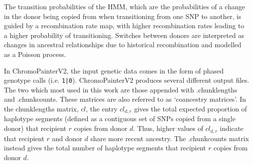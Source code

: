 The transition probabilities of the HMM, which are the probabilities of a change in the donor being copied from when transitioning from one SNP to another, is guided by a recombination rate map, with higher recombination rates leading to a higher probability of transitioning. Switches between donors are interpreted as changes in ancestral relationships due to historical recombination and modelled as a Poisson process. 

In ChromoPainterV2, the input genetic data comes in the form of phased genotype calls (i.e. \texttt{1|0}). ChromoPainterV2 produces several different output files. The two which most used in this work are those appended with .chunklengths and .chunkcounts. These matrices are also referred to as `coancestry matrices'. In the chunklengths matrix, $cl$, the entry $cl_{d,r}$ gives the total expected proportion of haplotype segments (defined as a contiguous set of SNPs copied from a single donor) that recipient $r$ copies from donor $d$. Thus, higher values of $cl_{d,r}$ indicate that recipient $r$ and donor $d$ share more recent ancestry. The .chunkcounts matrix instead gives the total number of haplotype segments that recipient $r$ copies from donor $d$.

